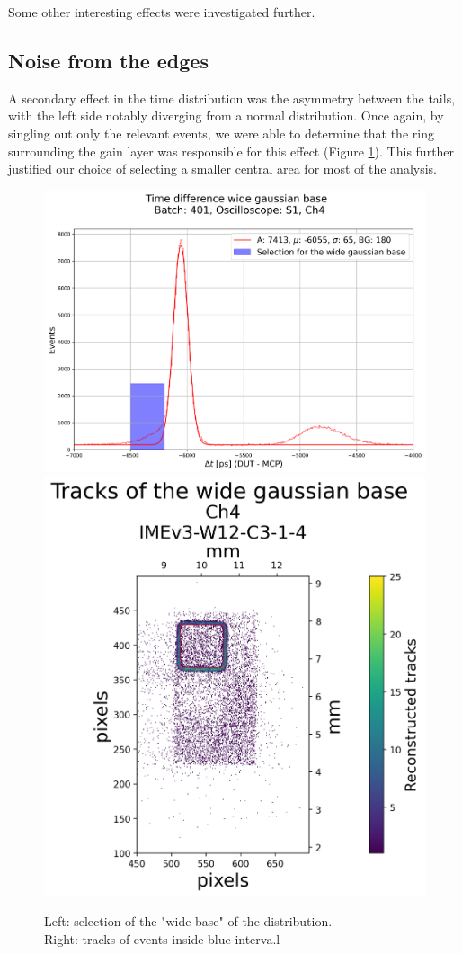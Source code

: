 Some other interesting effects were investigated further.



\subsection{Noise from the edges}\label{sec:deviations_from_gaussian}
A secondary effect in the time distribution was the asymmetry between the tails, with the left side notably diverging from a normal distribution. Once again, by singling out only the relevant events, we were able to determine that the ring surrounding the gain layer was responsible for this effect (Figure \ref{fig:time_difference_wide_gaussian}). This further justified our choice of selecting a smaller central area for most of the analysis.

\begin{figure}[h!tbp]
    \centering
    \includegraphics[width=.55\linewidth]{Images/detailed_analysis/time_difference_401_S1_dut_3_with_wide gaussian_left.png}
    \hfill
    \includegraphics[width=.43\linewidth]{Images/detailed_analysis/2D Tracks 401_S1_dut_3_with_wide_gaussian_base_left.png}
    \captionsetup{width=\captionwidth}
    \caption{Left: selection of the "wide base" of the distribution. \\
    Right: tracks of events inside blue interva.l}
    \label{fig:time_difference_wide_gaussian}
\end{figure}


